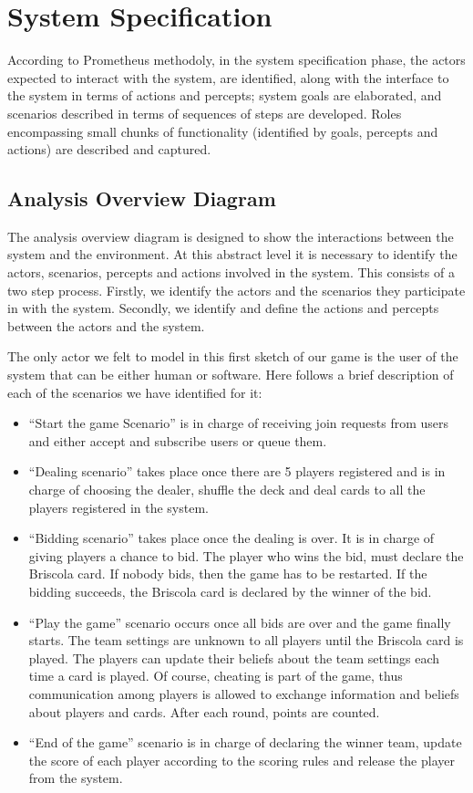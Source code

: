 \documentclass[a4paper]{article}
\begin{document}
\section{System Specification}\label{sec:sysspec} 

According to Prometheus methodoly, in the system specification phase, the actors expected to interact with the system, are identified, along with the interface to the system in terms of actions and percepts; system goals are elaborated, and scenarios described in terms of sequences of steps are developed. Roles encompassing small chunks of functionality (identified by goals, percepts and actions) are described and captured.

\subsection{Analysis Overview Diagram}

The analysis overview diagram is designed to show the interactions between the system and the environment. At this abstract level it is necessary to identify the actors, scenarios, percepts and actions involved in the system. This consists of a two step process. Firstly, we identify the actors and the scenarios they participate in with the system. Secondly, we identify and define the actions and percepts between the actors and the system. 

The only actor we felt to model in this first sketch of our game is the user of the system that can be either human or software. Here follows a brief description of each of the scenarios we have identified for it: 
\begin{itemize}
  \item ``Start the game Scenario'' is in charge of receiving join requests from users and either accept and subscribe users or queue them. 
  \item ``Dealing scenario'' takes place once there are 5 players registered and is in charge of choosing the dealer, shuffle the deck and deal cards to all the players registered in the system. 
  \item ``Bidding scenario'' takes place once the dealing is over. It is in charge of giving players a chance to bid. The player who wins the bid, must declare the Briscola card. If nobody bids, then the game has to be restarted. If the bidding succeeds, the Briscola card is declared by the winner of the bid.
  \item ``Play the game'' scenario occurs once all bids are over and the game finally starts. The team settings are  unknown to all players until the Briscola card is played. The players can update their beliefs about the team settings each time a card is played. Of course, cheating is part of the game, thus communication among players is allowed to exchange information and beliefs about players and cards. After each round, points are counted. 
  \item ``End of the game'' scenario is in charge of declaring the winner team, update the score of each player according to the scoring rules and release the player from the system. 
\end{itemize}
\end{document}
